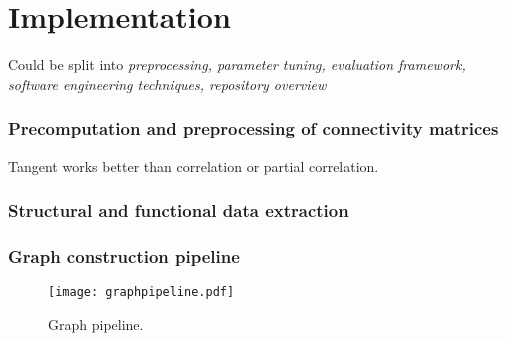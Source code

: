 \chapter{Implementation}


Could be split into \textit{preprocessing, parameter tuning, evaluation framework, software engineering techniques, repository overview}

\subsection{Precomputation and preprocessing of connectivity matrices}
Tangent works better than correlation or partial correlation.

\subsection{Structural and functional data extraction}


\subsection{Graph construction pipeline}

\begin{figure}[!ht]
    \texttt{[image: graphpipeline.pdf]}
    \label{graphpipeline}
    \caption{Graph pipeline.}
\end{figure}

